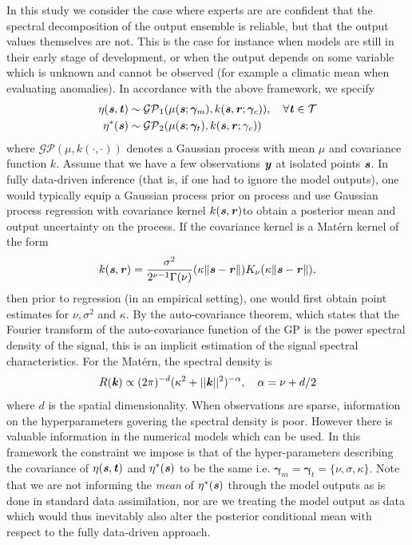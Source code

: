 \documentclass[10pt,a4paper]{article}
\newcommand{\gammab} {\boldsymbol{\gamma}}
\newcommand{\kvec} {\textbf{\textit{k}}}
\newcommand{\tvec} {\textbf{\textit{t}}}
\newcommand{\yvec} {\textbf{\textit{y}}}
\newcommand{\svec} {\textbf{\textit{s}}}
\newcommand{\rvec} {\textbf{\textit{r}}}
\begin{document}
In this study we consider the case where experts are are confident that the spectral decomposition of the output ensemble is reliable, but that the output values themselves are not. This is the case for instance when models are still in their early stage of development, or when the output depends on some variable which is unknown and cannot be observed (for example a climatic mean when evaluating anomalies). In accordance with the above framework, we specify
\begin{align}
\eta(\svec,\tvec) &\sim \mathcal{GP}_1(\mu(\svec;\gammab_m), k(\svec,\rvec;\gammab_c)), ~~~ \forall \tvec \in \mathcal{T} \\
\eta^*(\svec) &\sim \mathcal{GP}_2(\mu(\svec;\gammab_t), k(\svec,\rvec;\gamma_c))
\end{align}
\noindent where $\mathcal{GP}(\mu,k(\cdot,\cdot))$ denotes a Gaussian process with mean $\mu$ and covariance function $k$.
Assume that we have a few observations $\yvec$ at isolated points $\svec$. In fully data-driven inference (that is, if one had to ignore the model outputs), one would typically equip a Gaussian process prior on process and use Gaussian process regression with covariance kernel $k(\svec,\rvec)$to obtain a posterior mean and output uncertainty on the process. If the covariance kernel is a Mat{\'e}rn kernel of the form
\begin{equation}\label{eq:Matern}
k(\svec,\rvec) = \frac{\sigma^2}{2^{\nu-1}\Gamma(\nu)}(\kappa\| \svec - \rvec \|)K_\nu(\kappa\| \svec - \rvec \|),
\end{equation}
\noindent then prior to regression (in an empirical setting), one would first obtain point estimates for $\nu, \sigma^2$ and $\kappa$. By the auto-covariance theorem, which states that the Fourier transform of the auto-covariance function of the GP is the power spectral density of the signal, this is an implicit estimation of the signal spectral characteristics. For the Mat{\'e}rn, the spectral density is 
\begin{equation}
R(\kvec) \propto (2\pi)^{-d}(\kappa^2 + ||\kvec||^2)^{-\alpha}, ~~~ \alpha = \nu + d/2
\end{equation}
\noindent where $d$ is the spatial dimensionality. When observations are sparse, information on the hyperparameters govering the spectral density is poor. However there is valuable information in the numerical models which can be used. In this framework the constraint we impose is that of the hyper-parameters describing the covariance of $\eta(\svec,\tvec)$ and $\eta^*(\svec)$ to be the same i.e. $\gammab_m = \gammab_t = \{\nu, \sigma, \kappa\}$. Note that we are not informing the \emph{mean} of $\eta^*(\svec)$ through the model outputs as is done in standard data assimilation, nor are we treating the model output as data which would thus inevitably also alter the posterior conditional mean with respect to the fully data-driven approach.
\end{document}
